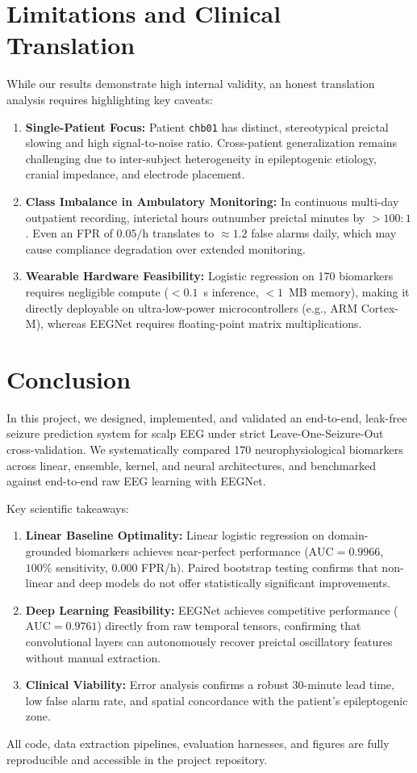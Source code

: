 \documentclass[10pt,journal,compsoc]{IEEEtran}
\begin{document}
\section{Limitations and Clinical Translation}
While our results demonstrate high internal validity, an honest translation analysis requires highlighting key caveats:
\begin{enumerate}
    \item \textbf{Single-Patient Focus:} Patient \texttt{chb01} has distinct, stereotypical preictal slowing and high signal-to-noise ratio. Cross-patient generalization remains challenging due to inter-subject heterogeneity in epileptogenic etiology, cranial impedance, and electrode placement.
    \item \textbf{Class Imbalance in Ambulatory Monitoring:} In continuous multi-day outpatient recording, interictal hours outnumber preictal minutes by $>100:1$. Even an FPR of $0.05/\text{h}$ translates to $\approx 1.2$ false alarms daily, which may cause compliance degradation over extended monitoring.
    \item \textbf{Wearable Hardware Feasibility:} Logistic regression on 170 biomarkers requires negligible compute ($<0.1$~s inference, $<1$~MB memory), making it directly deployable on ultra-low-power microcontrollers (e.g., ARM Cortex-M), whereas EEGNet requires floating-point matrix multiplications.
\end{enumerate}

\section{Conclusion}
In this project, we designed, implemented, and validated an end-to-end, leak-free seizure prediction system for scalp EEG under strict Leave-One-Seizure-Out cross-validation. We systematically compared 170 neurophysiological biomarkers across linear, ensemble, kernel, and neural architectures, and benchmarked against end-to-end raw EEG learning with EEGNet. 

Key scientific takeaways:
\begin{enumerate}
    \item \textbf{Linear Baseline Optimality:} Linear logistic regression on domain-grounded biomarkers achieves near-perfect performance ($\text{AUC} = 0.9966$, $100\%$ sensitivity, $0.000$ FPR/h). Paired bootstrap testing confirms that non-linear and deep models do not offer statistically significant improvements.
    \item \textbf{Deep Learning Feasibility:} EEGNet achieves competitive performance ($\text{AUC} = 0.9761$) directly from raw temporal tensors, confirming that convolutional layers can autonomously recover preictal oscillatory features without manual extraction.
    \item \textbf{Clinical Viability:} Error analysis confirms a robust 30-minute lead time, low false alarm rate, and spatial concordance with the patient's epileptogenic zone.
\end{enumerate}

All code, data extraction pipelines, evaluation harnesses, and figures are fully reproducible and accessible in the project repository.



\end{document}
